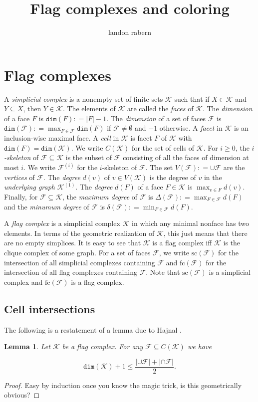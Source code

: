 \documentclass[12pt]{article}
\title{Flag complexes and coloring}
\author{landon rabern}
\theoremstyle{plain}
\newtheorem{lem}[thm]{Lemma}
\theoremstyle{definition}
\theoremstyle{remark}
\newcommand{\fancy}[1]{\mathcal{#1}}
\newcommand{\card}[1]{\left|#1\right|}
\newcommand{\parens}[1]{\left( #1 \right)}
\newcommand{\DefinedAs}{\mathrel{\mathop:}=}
\def\K{\fancy{K}}
\def\F{\fancy{F}}
\def\dim{\mathtt{dim}}
\renewcommand{\sc}[1]{\text{sc}\parens{#1}}
\newcommand{\fc}[1]{\text{fc}\parens{#1}}
\begin{document}
\maketitle

\section{Flag complexes}
A \emph{simplicial complex} is a nonempty set of finite sets $\K$ such that if $X \in \K$ and $Y \subseteq X$, then $Y \in \K$.  The elements of $\K$ are called the \emph{faces} of $\K$.  The \emph{dimension} of a face $F$ is $\dim(F) \DefinedAs \card{F} - 1$.  The \emph{dimension} of a set of faces $\F$ is $\dim(\F) \DefinedAs \max_{F \in \F} \dim(F)$ if $\F \neq \emptyset$ and $-1$ otherwise.  A \emph{facet} in $\K$ is an inclusion-wise maximal face.  A \emph{cell} in $\K$ is facet $F$ of $\K$ with $\dim(F) = \dim(\K)$.  We write $C(\K)$ for the set of cells of $\K$.  For $i \geq 0$, the \emph{$i$-skeleton} of $\F \subseteq \K$ is the subset of $\F$ consisting of all the faces of dimension at most $i$.  We write $\F^{(i)}$ for the $i$-skeleton of $\F$.  The set $V(\F) \DefinedAs \cup \F$ are the \emph{vertices} of $\F$. The \emph{degree} $d(v)$ of $v \in V(\K)$ is the degree of $v$ in the \emph{underlying graph} $\K^{(1)}$. The \emph{degree} $d(F)$ of a face $F \in \K$ is $\max_{v \in F} d(v)$.  Finally, for $\F \subseteq \K$, the \emph{maximum degree} of $\F$ is $\Delta(\F) \DefinedAs \max_{F \in \F} d(F)$ and the \emph{minumum degree} of $\F$ is $\delta(\F) \DefinedAs \min_{F \in \F} d(F)$.

A \emph{flag complex} is a simplicial complex $\K$ in which any minimal nonface has two elements.  In terms of the geometric realization of $\K$, this just means that there are no empty simplices.  It is easy to see that $\K$ is a flag complex iff $\K$ is the clique complex of some graph.  For a set of faces $\F$, we write $\sc{\F}$ for the intersection of all simplicial complexes containing $\F$ and $\fc{\F}$ for the intersection of all flag complexes containing $\F$.  Note that $\sc{\F}$ is a simplicial complex and $\fc{\F}$ is a flag complex.

\subsection{Cell intersections}
The following is a restatement of a lemma due to Hajnal \cite{hajnaltheorem}.

\begin{lem}
Let $\K$ be a flag complex.  For any $\F \subseteq C(\K)$ we have

\[\dim(\K) + 1 \leq \frac{\card{\cup \F} + \card{\cap \F}}{2}.\]
\end{lem}
\begin{proof}
Easy by induction once you know the magic trick, is this geometrically obvious?
\end{proof}
\end{document}
